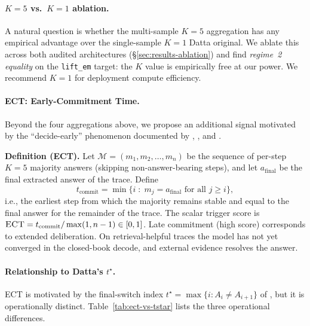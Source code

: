 \documentclass[11pt]{article}
\begin{document}
\paragraph{$K{=}5$ vs.\ $K{=}1$ ablation.} A natural question is whether the
multi-sample $K{=}5$ aggregation has any empirical advantage over the
single-sample $K{=}1$ Datta original. We ablate this across both
audited architectures (\S\ref{sec:results-ablation}) and find
\emph{regime~2 equality} on the \texttt{lift\_em} target: the $K$ value is
empirically free at our power. We recommend $K{=}1$ for deployment compute
efficiency.

\paragraph{ECT: Early-Commitment Time.} Beyond the four aggregations
above, we propose an additional signal motivated by the ``decide-early''
phenomenon documented by \citet{Datta_DecideEarlyExplainLater},
\citet{Wang_ChainOfProbeCoTStepByStep}, and
\citet{Chen_DynamicInstabilityLLMReasoning}.

\textbf{Definition (ECT).} Let
$\mathcal{M} = (m_1, m_2, \ldots, m_n)$ be the sequence of per-step
$K{=}5$ majority answers (skipping non-answer-bearing steps), and let
$a_{\text{final}}$ be the final extracted answer of the trace. Define
\begin{equation}
t_{\text{commit}} = \min \{ i \;:\; m_j = a_{\text{final}} \text{ for all } j \geq i \},
\label{eq:ect-tcommit}
\end{equation}
i.e., the earliest step from which the majority remains stable and equal to
the final answer for the remainder of the trace. The scalar trigger score is
$\textsc{ECT} = t_{\text{commit}} / \max(1, n - 1) \in [0, 1]$. Late
commitment (high score) corresponds to extended deliberation. On
retrieval-helpful traces the model has not yet converged in the closed-book
decode, and external evidence resolves the answer.

\paragraph{Relationship to Datta's $t^\star$.} ECT is motivated by the
final-switch index $t^\star = \max\{i : A_i \neq A_{i+1}\}$ of
\citet{Datta_DecideEarlyExplainLater}, but it is operationally distinct.
Table~\ref{tab:ect-vs-tstar} lists the three operational differences.
\end{document}
